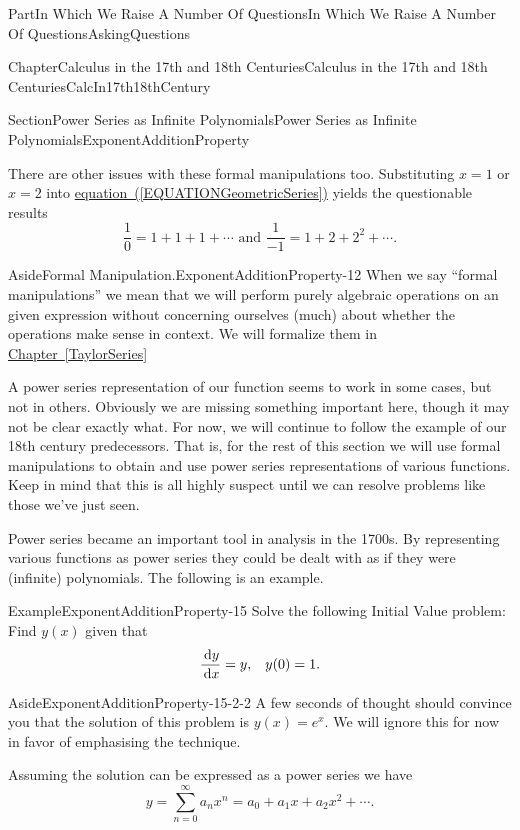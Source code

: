 \documentclass[oneside,10pt,]{book}
\newcommand{\xreffont}{\relax}
\numberwithin{equation}{part}
\newcommand{\dx}[1]{\,{\rm d}#1}
\newcommand{\amp}{&}
\begin{document}
\begin{partptx}{Part}{In Which We Raise A Number Of Questions}{}{In Which We Raise A Number Of Questions}{}{}{AskingQuestions}
\begin{chapterptx}{Chapter}{Calculus in the 17th and 18th Centuries}{}{Calculus in the 17th and 18th Centuries}{}{}{CalcIn17th18thCentury}
\begin{sectionptx}{Section}{Power Series as Infinite Polynomials}{}{Power Series as Infinite Polynomials}{}{}{ExponentAdditionProperty}
\par
There are other issues with these formal manipulations too. Substituting \(x=1\) or \(x=2\) into \hyperref[EQUATIONGeometricSeries]{equation~({\xreffont\ref{EQUATIONGeometricSeries}})} yields the questionable results%
\begin{equation*}
\frac{1}{0}=1+1+1+\cdots \text{  and  } \frac{1}{-1}=1+2+2^2+\cdots\text{.}
\end{equation*}
%
\begin{aside}{Aside}{Formal Manipulation.}{ExponentAdditionProperty-12}%
When we say ``formal manipulations'' we mean that we will perform purely algebraic operations on an given expression without concerning ourselves (much) about whether the operations make sense in context. We will formalize them in \hyperref[TaylorSeries]{Chapter~{\xreffont\ref{TaylorSeries}}}%
\end{aside}
A power series representation of our function seems to work in some cases, but not in others. Obviously we are missing something important here, though it may not be clear exactly what. For now, we will continue to follow the example of our 18th century predecessors.  That is, for the rest of this section we will use formal manipulations to obtain and use power series representations of various functions.  Keep in mind that this is all highly suspect until we can resolve problems like those we've just seen.%
\par
Power series became an important tool in analysis in the 1700s. By representing various functions as power series they could be dealt with as if they were (infinite) polynomials.  The following is an example.%
\begin{example}{Example}{}{ExponentAdditionProperty-15}%
Solve the following Initial Value problem: Find \(y(x)\) given that%
\begin{align*}
\frac{\dx{ y}}{\dx{
x}}=y,\amp{}\amp{}y(0)=1.
\end{align*}
%
\begin{aside}{Aside}{}{ExponentAdditionProperty-15-2-2}%
A few seconds of thought should convince you that the solution of this problem is \(y(x) = e^x\).  We will ignore this for now in favor of emphasising the technique.%
\end{aside}
Assuming the solution can be expressed as a power series we have%
\begin{equation*}
y=\sum_{n=0}^\infty
a_nx^n=a_0+a_1x+a_2x^2+\cdots \text{.}
\end{equation*}
%
\par

\end{example}
\end{sectionptx}
\end{chapterptx}
\end{partptx}
\end{document}
